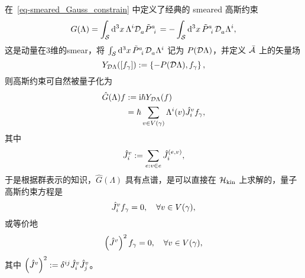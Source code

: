 		在~\eqref{eq-smeared_Gauss_constrain} 中定义了经典的 smeared 高斯约束
		\begin{equation}
			G(\Lambda) = \int_{\spc} \dd[3]{x} \tensor{\Lambda}{^i} \AD{a} \tensor{\tilde{P}}{^a_i} = - \int_{\spc} \dd[3]{x} \tensor{\tilde{P}}{^a_i} \AD{a} \tensor{\Lambda}{^i},
		\end{equation}
		这是动量在3维的smear，将 $\int_{\spc} \dd[3]{x} \tensor{\tilde{P}}{^a_i} \AD{a} \tensor{\Lambda}{^i}$ 记为 $P(\mathcal{D} \Lambda)$，并定义 $\bar{\mathcal{A}}$ 上的矢量场
		\begin{equation}
			Y_{\mathcal{D} \Lambda}([f_\gamma]) := \left\{ - P(\mathcal{D} \Lambda), f_\gamma \right\},
		\end{equation}
		则高斯约束可自然被量子化为
		\begin{equation}
			\begin{split}
				\hat{G}(\Lambda) f &\definedby \ii\hbar Y_{\ADd \Lambda}(f)\\
				&= \hbar \sum_{v\in V(\gamma)} \tensor{\Lambda}{^i}(v) \hat{J}^v_i f_\gamma,
			\end{split}
		\end{equation}
		其中
		\begin{equation}
			\hat{J}^v_i := \sum_{e:v\in e} \hat{J}^{(e,v)}_i,
		\end{equation}
		于是根据群表示的知识，$\hat{G}(\Lambda)$ 具有点谱，是可以直接在 $\mathcal{H}_{\text{kin}}$ 上求解的，量子高斯约束方程是
		\begin{equation}
			\hat{J}^v_i f_\gamma =0\qc \forall v \in V(\gamma),
		\end{equation}
		或等价地
		\begin{equation}
			\left( \hat{J}^v \right)^2 f_\gamma =0\qc \forall v \in V(\gamma),
		\end{equation}
		其中 $\left( \hat{J}^v \right)^2 \definedby \tensor{\delta}{^i^j} \hat{J}^v_i \hat{J}^v_j$。

